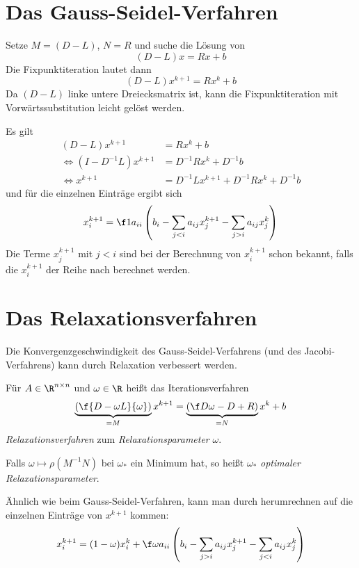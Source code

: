 \documentclass{mycourse}
\begin{document}
\section{Das Gauss-Seidel-Verfahren}


Setze $M=(D-L)$, $N=R$ und suche die Lösung von
\[
	(D-L)x = Rx + b
\]
Die Fixpunktiteration lautet dann
\[
	(D-L)x^{k+1} = Rx^k +b
\]
Da $(D-L)$ linke untere Dreiecksmatrix ist, kann die Fixpunktiteration mit Vorwärtssubstitution leicht gelöst werden.

Es gilt
\begin{align*}
	(D-L)x^{k+1} &= Rx^k + b \\
	\iff (I-D^{-1}L)x^{k+1} &= D^{-1}Rx^k + D^{-1}b\\
	\iff x^{k+1} &= D^{-1}Lx^{k+1} + D^{-1}Rx^k + D^{-1}b
\end{align*}
und für die einzelnen Einträge ergibt sich
\[
	x_i^{k+1} = \f 1{a_{ii}} \left(b_i - \sum_{j<i}a_{ij}x_j^{k+1} - \sum_{j>i}a_{ij}x_j^k\right)
\]
Die Terme $x_j^{k+1}$ mit $j<i$ sind bei der Berechnung von $x_i^{k+1}$ schon bekannt,
falls die $x_i^{k+1}$ der Reihe nach berechnet werden.



\section{Das Relaxationsverfahren}


Die Konvergenzgeschwindigkeit des Gauss-Seidel-Verfahrens (und des Jacobi-Verfahrens) kann durch Relaxation verbessert werden.

\begin{df}
	\label{df:4.9}
	Für $A\in \R^{n\times n}$ und $\omega\in \R$ heißt das Iterationsverfahren
	\[
		\underbrace{\left(\f {D-\omega L}{\omega}\right)}_{=M} x^{k+1} = \underbrace{\left(\f D\omega -D +R\right)}_{=N} x^k +b
	\]
	\emph{Relaxationsverfahren} zum \emph{Relaxationsparameter} $\omega$.

	Falls $\omega \mapsto \rho(M^{-1}N)$ bei $\omega_*$ ein Minimum hat, so heißt $\omega_*$ \emph{optimaler Relaxationsparameter}.
\end{df}

\begin{note}
	Ähnlich wie beim Gauss-Seidel-Verfahren, kann man durch herumrechnen auf die einzelnen Einträge von $x^{k+1}$ kommen:
	\[
		x_i^{k+1} = (1-\omega)x_i^k + \f \omega{a_{ii}}	\left(b_i - \sum_{j>i}a_{ij}x_j^{k+1} - \sum_{j<i}a_{ij}x_j^k\right)
	\]

\end{note}
\end{document}

